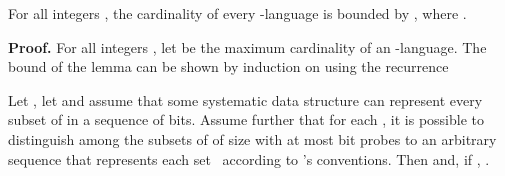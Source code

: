 \documentclass[envcountsame,envcountsect,undated,nolinenumbers]{lnthi}
\begin{document}
\begin{lemma}
\label{lem:counting}For all integers , the cardinality
of every -language 
is bounded by ,
where .
\end{lemma}

\noindent\textbf{Proof.}
For all integers , let
 be the maximum cardinality of
an -language.
The bound of the lemma can be shown by induction
on  using the recurrence


\begin{theorem}
\label{thm:lower}Let , let  and assume that
some systematic data structure 
can represent every subset of 
in a sequence  of  bits.
Assume further that for each ,
it is possible to distinguish
among the  subsets  of 
of size  with at most  bit probes to an
arbitrary sequence  that represents each set~
according to 's conventions.
Then 
and, if , .
\end{theorem}
\end{document}
